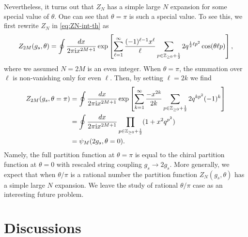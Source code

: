 \documentclass[11pt]{article}
\newcommand{\ri}{{\rm i}}
\def\th{\theta}
\newcommand{\hf}{\frac{1}{2}}
\renewcommand{\[}{\begin{eqnarray}}
\renewcommand{\]}{\end{eqnarray}}
\begin{document}
Nevertheless, 
it turns out that $Z_N$ has a simple large $N$ expansion for some special value of $\th$.
One can see that $\th=\pi$ is such a special value.
To see this, we first rewrite $Z_{N}$ in \eqref{eq:ZN-int-th} as 
\begin{align}
  Z_{2M}(g_s,\th)=\oint\frac{dx}{2\pi\ri x^{2M+1}}\exp\left[\sum_{\ell=1}^\infty 
\frac{(-1)^{\ell-1}x^\ell}{\ell}\sum_{p\in\mathbb{Z}_{\geq0}+\hf} 2q^{\hf\ell p^2}
\cos(\th\ell p )\right],
\label{eq:Z2N-th}
\end{align}
where we assumed $N=2M$ is an even integer.
When $\th=\pi$,
the summation over $\ell$ is non-vanishing only for even $\ell$. Then, by setting $\ell=2k$ we find
\begin{align}
\begin{aligned}
  Z_{2M}(g_s,\th=\pi)&=\oint\frac{dx}{2\pi\ri x^{2M+1}}\exp\left[\sum_{k=1}^\infty 
\frac{-x^{2k}}{2k}\sum_{p\in\mathbb{Z}_{\geq0}+\hf}  2q^{k p^2}(-1)^k\right]\\
 &=\oint\frac{dx}{2\pi\ri x^{2M+1}}\prod_{p\in\mathbb{Z}_{\geq0}+\hf}(1+x^2 q^{p^2})\\
&=\psi_M(2g_s,\th=0).
\end{aligned}
\end{align}
Namely, the full partition function at $\th=\pi$ is equal to
the chiral partition function at $\th=0$ with rescaled string coupling $g_s\to2g_s$.
More generally, we expect that when $\th/\pi$ is a rational number
the partition function $Z_N(g_s,\th)$ has a simple large $N$ expansion.
We leave the study of rational $\th/\pi$ case as an interesting future problem.

\section{Discussions \label{sec:discussion}}
\end{document}
